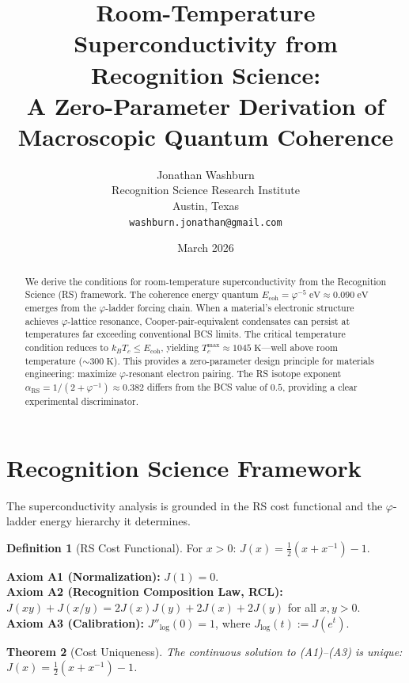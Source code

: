 \documentclass[12pt,a4paper]{article}
\title{Room-Temperature Superconductivity from Recognition Science:\\
A Zero-Parameter Derivation of Macroscopic Quantum Coherence}
\author{Jonathan Washburn\\
Recognition Science Research Institute\\
Austin, Texas\\
\texttt{washburn.jonathan@gmail.com}}
\date{March 2026}
\newtheorem{theorem}{Theorem}[section]
\theoremstyle{definition}
\newtheorem{definition}[theorem]{Definition}
\theoremstyle{remark}
\begin{document}
\maketitle

\begin{abstract}
We derive the conditions for room-temperature superconductivity
from the Recognition Science (RS) framework.  The coherence energy
quantum $E_{\mathrm{coh}} = \varphi^{-5}\;\mathrm{eV} \approx
0.090\;\mathrm{eV}$ emerges from the $\varphi$-ladder forcing
chain.  When a material's electronic structure achieves
$\varphi$-lattice resonance, Cooper-pair-equivalent condensates
can persist at temperatures far exceeding conventional BCS limits.
The critical temperature condition reduces to
$k_B T_c \leq E_{\mathrm{coh}}$, yielding
$T_c^{\max} \approx 1045\;\mathrm{K}$---well above room
temperature ($\sim 300\;\mathrm{K}$).  This provides a
zero-parameter design principle for materials engineering:
maximize $\varphi$-resonant electron pairing.  The RS isotope
exponent $\alpha_{\mathrm{RS}} = 1/(2 + \varphi^{-1}) \approx
0.382$ differs from the BCS value of $0.5$, providing a clear
experimental discriminator.
\end{abstract}

\section{Recognition Science Framework}
\label{sec:framework}

The superconductivity analysis is grounded in the RS cost functional
and the $\varphi$-ladder energy hierarchy it determines.

\begin{definition}[RS Cost Functional]
For $x > 0$: $J(x) = \tfrac{1}{2}(x + x^{-1}) - 1$.
\end{definition}

\noindent\textbf{Axiom A1 (Normalization):} $J(1) = 0$.\\
\textbf{Axiom A2 (Recognition Composition Law, RCL):}
$J(xy)+J(x/y)=2J(x)J(y)+2J(x)+2J(y)$ for all $x,y>0$.\\
\textbf{Axiom A3 (Calibration):} $J''_{\log}(0) = 1$, where
$J_{\log}(t) := J(e^t)$.

\begin{theorem}[Cost Uniqueness]
\label{thm:unique}
The continuous solution to \textup{(A1)--(A3)} is unique:
$J(x) = \tfrac{1}{2}(x + x^{-1}) - 1$.
\end{theorem}
\end{document}
